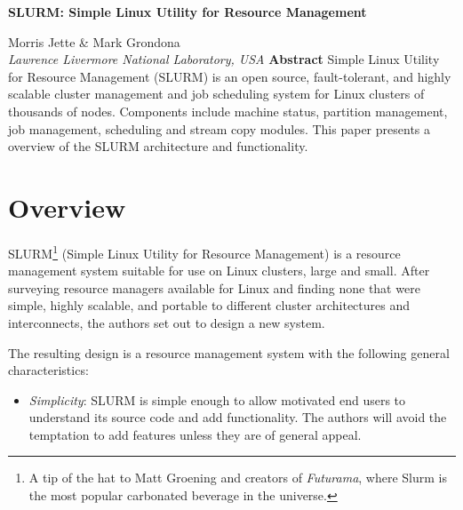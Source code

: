 \documentclass[10pt,onecolumn,times]{../common/llncs}
\def\ctit{SLURM: Simple Linux Utility for Resource Management}
\def\ucrl{UCRL-MA-147996 REV 3}
\def\auth{Morris Jette \\ Mark Grondona}
\def\pubdate{June 23, 2003}
\def\journal{ClusterWorld Conference and Expo}
\begin{document}

\vspace*{35mm}
\noindent\Large
\textbf{\ctit}
\baselineskip
\noindent\large
{Morris Jette \&  Mark Grondona \\
{\em Lawrence Livermore National Laboratory, USA}
\baselineskip
\noindent\large
\textbf{Abstract}
\baselineskip
\noindent\normalsize
Simple Linux Utility for Resource Management (SLURM) is an open source,
fault-tolerant, and highly scalable cluster management and job scheduling
system for Linux clusters of thousands of nodes.  Components include
machine status, partition management, job management, scheduling and
stream copy modules.  This paper presents a overview of the SLURM
architecture and functionality.

\newcommand{\munged}{{\tt munged}}
\newcommand{\srun}{{\tt srun}}
\newcommand{\scancel}{{\tt scancel}}
\newcommand{\squeue}{{\tt squeue}}
\newcommand{\scontrol}{{\tt scontrol}}
\newcommand{\sinfo}{{\tt sinfo}}
\newcommand{\slurmctld}{{\tt slurmctld}}
\newcommand{\slurmd}{{\tt slurmd}}


\section{Overview}

SLURM\footnote{A tip of the hat to Matt Groening and creators of {\em Futurama},
where Slurm is the most popular carbonated beverage in the universe.} 
(Simple Linux Utility for Resource Management) is a resource management 
system suitable for use on Linux clusters, large and small.  After 
surveying\cite{Jette2002} resource managers available for Linux and finding 
none that were simple, highly scalable, and portable to different cluster 
architectures and interconnects, the authors set out to design a new system.

The resulting design is a resource management system with the following general
characteristics:

\begin{itemize}
\item {\em Simplicity}: SLURM is simple enough to allow motivated end users
to understand its source code and add functionality.  The authors will 
avoid the temptation to add features unless they are of general appeal. 


\end{itemize}}
\end{document}
